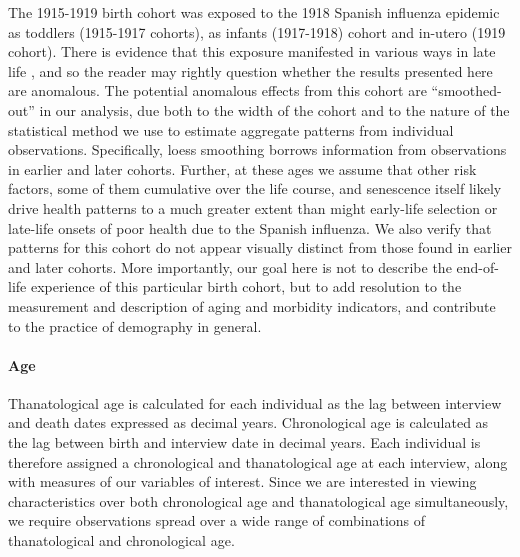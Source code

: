 \documentclass[11pt,oneside]{article} %
\begin{document}
The 1915-1919 birth cohort was exposed to the 1918 Spanish influenza
epidemic as toddlers (1915-1917 cohorts), as infants (1917-1918) cohort and
in-utero (1919 cohort). There is evidence that this exposure manifested in
various ways in late life \citep[e.g.,][]{almond20061918,myrskyla2013early}, and
so the reader may rightly question whether the results presented here are anomalous.
The potential anomalous effects from this cohort are
``smoothed-out'' in our analysis, due both to the width of the cohort and to the
nature of the statistical method we use to estimate aggregate patterns from
individual observations. Specifically, loess smoothing borrows information
from observations in earlier and later cohorts. Further, at these ages we assume that other risk factors,
some of them cumulative over the life course, and senescence itself likely drive
health patterns to a much greater extent than might early-life selection or
late-life onsets of poor health due to the Spanish influenza.
We also verify that patterns for this cohort do not appear visually distinct
from those found in earlier and later cohorts. More importantly, our goal here
is not to describe the end-of-life experience of this particular birth cohort, but to add
resolution to the measurement and description of aging and morbidity
indicators, and contribute to the practice of demography in general. 

\paragraph*{Age}
Thanatological age is calculated for each individual as the lag between
interview and death dates expressed as decimal years. Chronological age is
calculated as the lag between birth and interview date in decimal years. Each
individual is therefore assigned a chronological and thanatological age at each
interview, along with measures of our variables of interest. Since
we are interested in viewing characteristics over both chronological age and
thanatological age simultaneously, we require observations spread over a wide
range of combinations of thanatological and chronological age.
\end{document}
